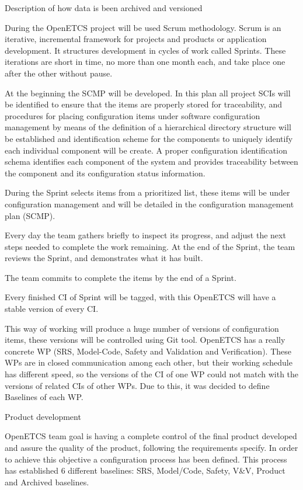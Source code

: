 \documentclass{template/openetcs_article}
\begin{document}
Description of how data is been archived and versioned

During the OpenETCS project will be used Scrum methodology. Scrum is an iterative, incremental framework for projects and products or application development. It structures development in cycles of work called Sprints. These iterations are short in time, no more than one month each, and take place one after the other without pause. 

At the beginning the SCMP will be developed. In this plan all project SCIs will be identified to ensure that the items are properly stored for traceability, and procedures for placing configuration items under software configuration management by means of the definition of a hierarchical directory structure will be established and identification scheme for the components to uniquely identify each individual component will be create. A proper configuration identification schema identifies each component of the system and provides traceability between the component and its configuration status information.

During the Sprint selects items from a prioritized list, these items will be under configuration management and will be detailed in the configuration management plan (SCMP). 

Every day the team gathers briefly to inspect its progress, and adjust the next steps needed to complete the work remaining. At the end of the Sprint, the team reviews the Sprint, and demonstrates what it has built. 

The team commits to complete the items by the end of a Sprint.

Every finished CI of Sprint will be tagged, with this OpenETCS will have a stable version of every CI.

This way of working will produce a huge number of versions of configuration items, these versions will be controlled using Git tool. OpenETCS has a really concrete WP (SRS, Model-Code, Safety and Validation and Verification). These WPs are in closed communication among each other, but their working schedule has different speed, so the versions of the CI of one WP could not match with the versions of related CIs of other WPs. Due to this, it was decided to define Baselines of each WP.

Product development

OpenETCS team goal is having a complete control of the final product developed and assure the quality of the product, following the requirements specify. In order to achieve this objective a configuration process has been defined. This process has established 6 different baselines: SRS, Model/Code, Safety, V\&V, Product and Archived baselines. 
\end{document}
